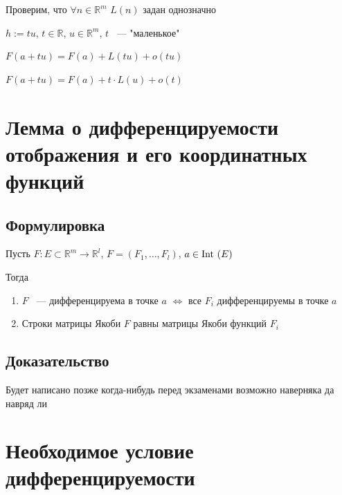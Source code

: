 \documentclass{article}
\begin{document}
            Проверим, что $\forall n \in \mathbb{R}^m$ $L(n)$ задан однозначно
            
            $h := tu$, $t \in \mathbb{R}$, $u \in \mathbb{R}^m$, $t$ ~--- "маленькое"
            
            $F(a + tu) = F(a) + L(tu) + o(tu)$
            
            $F(a + tu) = F(a) + t \cdot L(u) + o(t)$
            
    \newpage
    
    \section{Лемма о дифференцируемости отображения и его координатных функций}
    
        \subsection{Формулировка}
        
            Пусть $F : E \subset \mathbb{R}^m \rightarrow \mathbb{R}^l$, $F = (F_1, \ldots, F_l)$, $a \in \Int (E)$
        
            Тогда 
            
                \begin{enumerate}
                
                    \item $F$ ~--- дифференцируема в точке $a$ $\Leftrightarrow$ все $F_i$ дифференцируемы в точке $a$
                    
                    \item Строки матрицы Якоби $F$ равны матрицы Якоби функций $F_i$
                
                \end{enumerate}
            
        \subsection{Доказательство}
        
            Будет написано позже когда-нибудь перед экзаменами возможно наверняка да навряд ли

    \newpage
    
    \section{Необходимое условие дифференцируемости}
    
\end{document}
